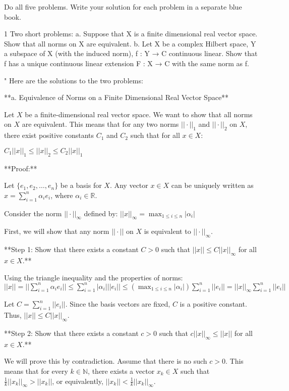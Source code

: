 Do all five problems. Write your solution for each problem in a separate blue book.

1 Two short problems:
a. Suppose that X is a finite dimensional real vector space. Show that all norms on X are equivalent.
b. Let X be a complex Hilbert space, Y a subspace of X (with the induced norm), f : Y → C continuous linear. Show that f has a unique continuous linear extension F : X → C with the same norm as f.

"
Here are the solutions to the two problems:

**a. Equivalence of Norms on a Finite Dimensional Real Vector Space**

Let $X$ be a finite-dimensional real vector space. We want to show that all norms on $X$ are equivalent. This means that for any two norms $||\cdot||_1$ and $||\cdot||_2$ on $X$, there exist positive constants $C_1$ and $C_2$ such that for all $x \in X$:

$C_1 ||x||_1 \le ||x||_2 \le C_2 ||x||_1$

**Proof:**

Let $\{e_1, e_2, \dots, e_n\}$ be a basis for $X$. Any vector $x \in X$ can be uniquely written as $x = \sum_{i=1}^n \alpha_i e_i$, where $\alpha_i \in \mathbb{R}$.

Consider the norm $||\cdot||_\infty$ defined by:
$||x||_\infty = \max_{1 \le i \le n} |\alpha_i|$

First, we will show that any norm $||\cdot||$ on $X$ is equivalent to $||\cdot||_\infty$.

**Step 1: Show that there exists a constant $C > 0$ such that $||x|| \le C ||x||_\infty$ for all $x \in X$.**

Using the triangle inequality and the properties of norms:
$||x|| = ||\sum_{i=1}^n \alpha_i e_i|| \le \sum_{i=1}^n |\alpha_i| ||e_i|| \le (\max_{1 \le i \le n} |\alpha_i|) \sum_{i=1}^n ||e_i|| = ||x||_\infty \sum_{i=1}^n ||e_i||$

Let $C = \sum_{i=1}^n ||e_i||$. Since the basis vectors are fixed, $C$ is a positive constant. Thus, $||x|| \le C ||x||_\infty$.

**Step 2: Show that there exists a constant $c > 0$ such that $c ||x||_\infty \le ||x||$ for all $x \in X$.**

We will prove this by contradiction. Assume that there is no such $c > 0$. This means that for every $k \in \mathbb{N}$, there exists a vector $x_k \in X$ such that $\frac{1}{k} ||x_k||_\infty > ||x_k||$, or equivalently, $||x_k|| < \frac{1}{k} ||x_k||_\infty$.


